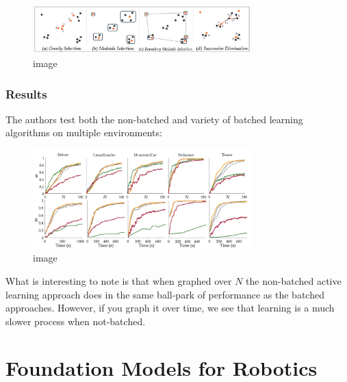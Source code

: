 \documentclass[
  letterpaper,
  DIV=11,
  numbers=noendperiod,
  oneside]{scrreprt}
\theoremstyle{remark}
\begin{document}
\begin{figure}[H]

{\centering \includegraphics[width=0.75\textwidth,height=\textheight]{Figures/greedy.png}

}

\caption{image}

\end{figure}%

\subsubsection{Results}\label{results}

The authors test both the non-batched and variety of batched learning
algorithms on multiple environments:

\begin{figure}[H]

{\centering \includegraphics[width=0.75\textwidth,height=\textheight]{Figures/activeresults.png}

}

\caption{image}

\end{figure}%

What is interesting to note is that when graphed over \(N\) the
non-batched active learning approach does in the same ball-park of
performance as the batched approaches. However, if you graph it over
time, we see that learning is a much slower process when not-batched.

\section{Foundation Models for
Robotics}\label{foundation-models-for-robotics}
\end{document}

